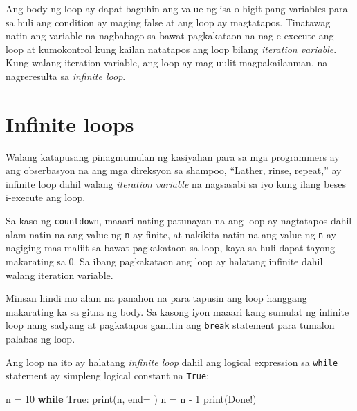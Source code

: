 \documentclass[10pt,]{book}
\newenvironment{Shaded}{}{}
\newcommand{\BuiltInTok}[1]{\textcolor[rgb]{0.00,0.50,0.00}{#1}}
\newcommand{\ControlFlowTok}[1]{\textcolor[rgb]{0.00,0.44,0.13}{\textbf{#1}}}
\newcommand{\DecValTok}[1]{\textcolor[rgb]{0.25,0.63,0.44}{#1}}
\newcommand{\NormalTok}[1]{#1}
\newcommand{\OperatorTok}[1]{\textcolor[rgb]{0.40,0.40,0.40}{#1}}
\newcommand{\StringTok}[1]{\textcolor[rgb]{0.25,0.44,0.63}{#1}}
\newcommand{\VariableTok}[1]{\textcolor[rgb]{0.10,0.09,0.49}{#1}}
\begin{document}
  

Ang body ng loop ay dapat baguhin ang value ng isa o higit pang
variables para sa huli ang condition ay maging false at ang loop ay
magtatapos. Tinatawag natin ang variable na nagbabago sa bawat
pagkakataon na nag-e-execute ang loop at kumokontrol kung kailan
natatapos ang loop bilang \emph{iteration variable}. Kung walang
iteration variable, ang loop ay mag-uulit magpakailanman, na
nagreresulta sa \emph{infinite loop}.

\section{Infinite loops}\label{infinite-loops}

Walang katapusang pinagmumulan ng kasiyahan para sa mga programmers ay
ang obserbasyon na ang mga direksyon sa shampoo, ``Lather, rinse,
repeat,'' ay infinite loop dahil walang \emph{iteration variable} na
nagsasabi sa iyo kung ilang beses i-execute ang loop.

 

Sa kaso ng \texttt{countdown}, maaari nating patunayan na ang loop ay
nagtatapos dahil alam natin na ang value ng \texttt{n} ay finite, at
nakikita natin na ang value ng \texttt{n} ay nagiging mas maliit sa
bawat pagkakataon sa loop, kaya sa huli dapat tayong makarating sa 0. Sa
ibang pagkakataon ang loop ay halatang infinite dahil walang iteration
variable.

 

Minsan hindi mo alam na panahon na para tapusin ang loop hanggang
makarating ka sa gitna ng body. Sa kasong iyon maaari kang sumulat ng
infinite loop nang sadyang at pagkatapos gamitin ang \texttt{break}
statement para tumalon palabas ng loop.

Ang loop na ito ay halatang \emph{infinite loop} dahil ang logical
expression sa \texttt{while} statement ay simpleng logical constant na
\texttt{True}:

\begin{Shaded}
\begin{Highlighting}[]
\NormalTok{n }\OperatorTok{=} \DecValTok{10}
\ControlFlowTok{while} \VariableTok{True}\NormalTok{:}
    \BuiltInTok{print}\NormalTok{(n, end}\OperatorTok{=}\StringTok{\textquotesingle{} \textquotesingle{}}\NormalTok{)}
\NormalTok{    n }\OperatorTok{=}\NormalTok{ n }\OperatorTok{{-}} \DecValTok{1}
\BuiltInTok{print}\NormalTok{(}\StringTok{\textquotesingle{}Done!\textquotesingle{}}\NormalTok{)}
\end{Highlighting}
\end{Shaded}
\end{document}
